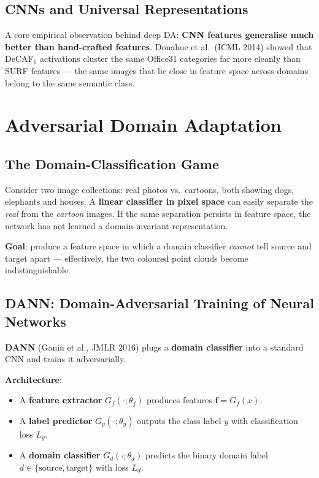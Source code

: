 \documentclass[11pt,a4paper]{article}
\theoremstyle{definition}
\theoremstyle{plain}
\theoremstyle{remark}
\begin{document}
\subsection{CNNs and Universal Representations}

A core empirical observation behind deep DA: \textbf{CNN features generalise much better than hand-crafted features}. Donahue et al.\ (ICML 2014) showed that DeCAF$_6$ activations cluster the same Office31 categories far more cleanly than SURF features --- the same images that lie close in feature space across domains belong to the same semantic class.


\section{Adversarial Domain Adaptation}

\subsection{The Domain-Classification Game}

Consider two image collections: real photos vs.\ cartoons, both showing dogs, elephants and houses. A \textbf{linear classifier in pixel space} can easily separate the \emph{real} from the \emph{cartoon} images. If the same separation persists in feature space, the network has not learned a domain-invariant representation.

\textbf{Goal}: produce a feature space in which a domain classifier \emph{cannot} tell source and target apart --- effectively, the two coloured point clouds become indistinguishable.

\subsection{DANN: Domain-Adversarial Training of Neural Networks}

\textbf{DANN} (Ganin et al., JMLR 2016) plugs a \textbf{domain classifier} into a standard CNN and trains it adversarially.

\textbf{Architecture}:
\begin{itemize}
    \item A \textbf{feature extractor} $G_f(\cdot;\theta_f)$ produces features $\mathbf{f} = G_f(x)$.
    \item A \textbf{label predictor} $G_y(\cdot;\theta_y)$ outputs the class label $y$ with classification loss $L_y$.
    \item A \textbf{domain classifier} $G_d(\cdot;\theta_d)$ predicts the binary domain label $d \in \{\text{source},\text{target}\}$ with loss $L_d$.
\end{itemize}
\end{document}
